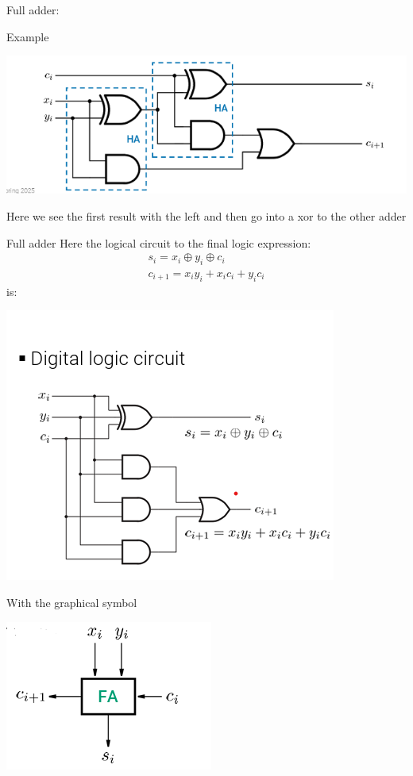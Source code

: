 \begin{parag}{Full adder:}
\begin{subparag}{Example}
        \begin{center}
            \includegraphics[scale=0.7]{22025-03-14.png}
        \end{center}
        Here we see the first result with the left  and then go into a xor to the other adder
    \end{subparag}

    \begin{subparag}{Full adder}
        Here the logical circuit to the final logic expression:
        \begin{align*}
            s_i = x_i \oplus y_i \oplus c_i \\
            c_{i+1} = x_iy_i + x_ic_i + y_ic_i
        \end{align*}
        is:
        \begin{center}
            \includegraphics[scale=0.5]{32025-03-14.png}
        \end{center}
    With the graphical symbol     
        \begin{center}
            \includegraphics[scale=1.1]{42025-03-14.png}

\end{center}
\end{subparag}
\end{parag}
